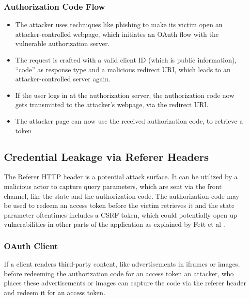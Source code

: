 \documentclass[
    fontsize=12pt,
    headings=small,
    parskip=half,           %
    bibliography=totoc,
    numbers=noenddot,       %
    open=any,               %
    ]{scrreprt}
\begin{document}
\subsubsection{Authorization Code Flow}
\begin{itemize}

    \item The attacker uses techniques like phishing to make its victim open an
        attacker-controlled webpage, which initiates an OAuth flow with the
        vulnerable authorization server.
	
    \item The request is crafted with a valid client ID (which is public
        information), ``code'' as response type and a malicious redirect URI,
        which leads to an attacker-controlled server again.
	
    \item If the user logs in at the authorization server, the authorization
        code now gets transmitted to the attacker's webpage, via the redirect
        URI.
	
    \item The attacker page can now use the received authorization code, to
        retrieve a token 

\end{itemize}


\subsection{Credential Leakage via Referer Headers}
\label{subsec:cred_leak_ref_headers}
The Referer HTTP header is a potential attack surface. It can be utilized by a
malicious actor to capture query parameters, which are sent via the front
channel, like the state and the authorization code. The authorization code may
be used to redeem an access token before the victim retrieves it and the state
parameter oftentimes includes a CSRF token, which could potentially open up
vulnerabilities in other parts of the application as explained by Fett et al
\cite{fett2016comprehensive}.

\subsubsection{OAuth Client}
If a client renders third-party content, like advertisements in iframes or
images, before redeeming the authorization code for an access token an
attacker, who places these advertisements or images can capture the code via
the referer header and redeem it for an access token.
\end{document}
